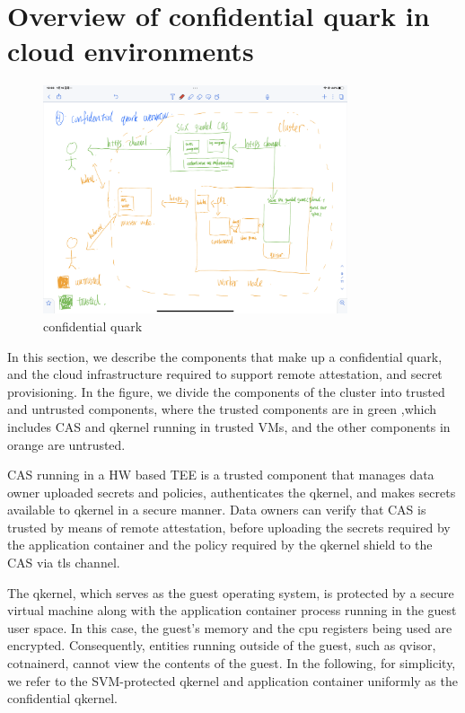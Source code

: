\section{Overview of confidential quark in cloud environments}
\begin{figure}[H]
    \centering
    \includegraphics[width=0.8\textwidth]{images/IMG_4414.PNG}
    \caption[confidential quark]{confidential quark}
    \label{fig:confidential_quark}
\end{figure}
In this section, we describe the components that make up a confidential quark, and the cloud infrastructure required to support remote attestation, and secret provisioning.
In the figure, we divide the components of the cluster into trusted and untrusted components, where the trusted components are in green ,which includes CAS and qkernel running in trusted VMs, and the other components in orange are untrusted.

CAS running in a HW based TEE is a trusted component that manages data owner uploaded secrets and policies, authenticates the qkernel, and makes secrets available to qkernel in a secure manner. Data owners can verify that CAS is trusted by means of remote attestation, before uploading the secrets required by the application container and the policy required by the qkernel shield to the CAS via tls channel.

The qkernel, which serves as the guest operating system, is protected by a secure virtual machine along with the application container process running in the guest user space. In this case, the guest's memory and the cpu registers being used are encrypted. Consequently, entities running outside of the guest, such as qvisor, cotnainerd, cannot view the contents of the guest.
In the following, for simplicity, we refer to the SVM-protected qkernel and application container uniformly as the confidential qkernel. 

